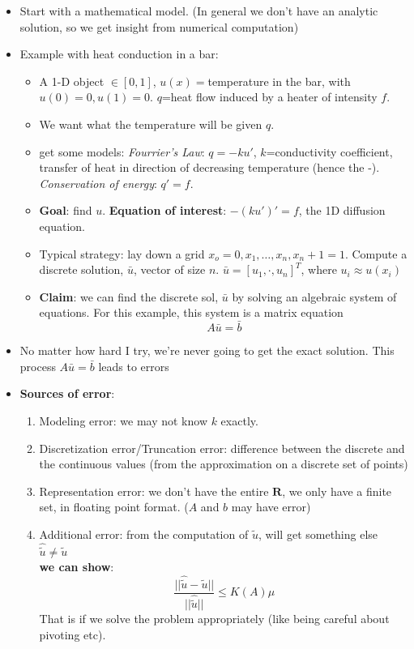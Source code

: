 \begin{itemize}
\item Start with a mathematical model. (In general we don't have an analytic solution, so we get
  insight from numerical computation)
\item Example with heat conduction in a bar:
  \begin{itemize}
  \item A 1-D object $\in [0, 1]$, $u(x)=$temperature in the bar, with
  $u(0)=0, u(1) = 0$. $q$=heat flow induced by a heater of intensity $f$.
  \item We want what the temperature will be given $q$.
  \item get some models: \emph{Fourrier's Law}: $q= -ku'$, $k$=conductivity
    coefficient, transfer of heat in direction of decreasing
    temperature (hence the -). \emph{Conservation of energy}: $q' = f$.
  \item \textbf{Goal}: find $u$. \textbf{Equation of interest}: $-(ku')' = f$, the 1D diffusion
    equation.
  \item Typical strategy: lay down a grid $x_o=0, x_1, \dots, x_n,
    x_n+1=1$. Compute a discrete solution, $\bar{u}$, vector of size $n$. $\bar{u} = [u_1, \cdot, u_n]^T$, where $u_i \approx u(x_i)$
  \item \textbf{Claim}: we can find the discrete sol, $\bar{u}$ by
    solving an algebraic system of equations. For this example, this
    system is a matrix equation $$A\bar{u} = \bar{b}$$

  \end{itemize}
  \item No matter how hard I try, we're never going to get the exact
    solution. This process $A\bar{u}=\bar{b}$ leads to errors
  \item \textbf{Sources of error}:
    \begin{enumerate}
       \item Modeling error: we may not know $k$ exactly.
       \item Discretization error/Truncation error: difference between the discrete and
         the continuous values (from the approximation on a discrete
         set of points)
       \item Representation error: we don't have the entire
         $\mathbf{R}$, we only have a finite set, in floating point
         format. ($A$ and $b$ may have error)
       \item Additional error: from the computation of $\tilde{u}$,
         will get something else $\hat{\tilde{u}}\neq \tilde{u}$\\
        \textbf{we can show}: $$\frac{||\hat{\tilde{u}} -
           \tilde{u}||}{||\hat{\tilde{u}}||} \le K(A)\mu$$ That is if we
         solve the problem appropriately (like being careful about
         pivoting etc).
         

\end{enumerate}
\end{itemize}
